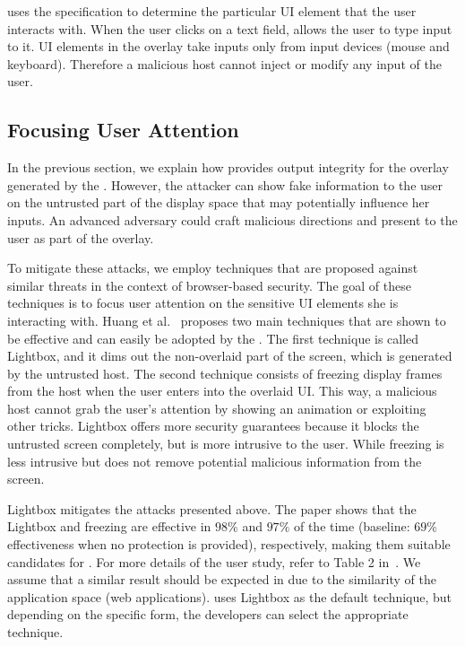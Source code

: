 \device uses the specification to determine the particular UI element that the user interacts with. When the user clicks on a text field, \device allows the user to type input to it. UI elements in the overlay take inputs only from input devices (mouse and keyboard). Therefore a malicious host cannot inject or modify any input of the user.

\subsection{Focusing User Attention}
\label{sec:systemDesign:userAttention}

In the previous section, we explain how \name provides output integrity for the overlay generated by the \device. However, the attacker can show fake information to the user on the untrusted part of the display space that may potentially influence her inputs. An advanced adversary could craft malicious directions and present to the user as part of the overlay.

To mitigate these attacks, we employ techniques that are proposed against similar threats in the context of browser-based security. The goal of these techniques is to focus user attention on the sensitive UI elements she is interacting with. Huang et al.~\cite{huang2012clickjacking} proposes two main techniques that are shown to be effective and can easily be adopted by the \device.  The first technique is called Lightbox, and it dims out the non-overlaid part of the screen, which is generated by the untrusted host. The second technique consists of freezing display frames from the host when the user enters into the overlaid UI. This way, a malicious host cannot grab the user's attention by showing an animation or exploiting other tricks.
Lightbox offers more security guarantees because it blocks the untrusted screen completely, but is more intrusive to the user. While freezing is less intrusive but does not remove potential malicious information from the screen.

Lightbox mitigates the attacks presented above. The paper shows that the Lightbox and freezing are effective in $98\%$ and $97\%$ of the time (baseline: $69\%$ effectiveness when no protection is provided), respectively, making them suitable candidates for \name. For more details of the user study, refer to Table 2 in~\cite{huang2012clickjacking}. We assume that a similar result should be expected in \name due to the similarity of the application space (web applications). \device uses Lightbox as the default technique, but depending on the specific form, the developers can select the appropriate technique.


